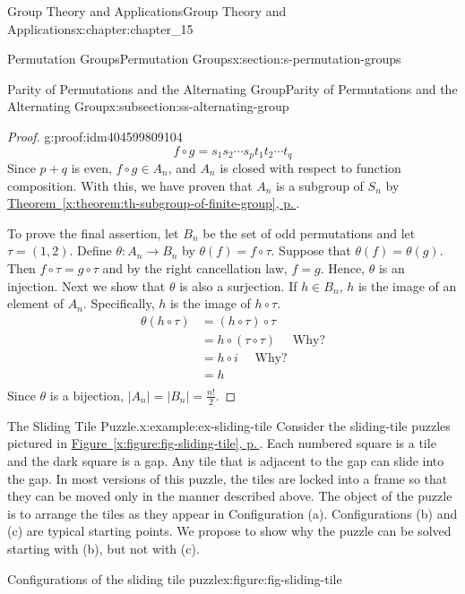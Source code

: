 \documentclass[twoside,10pt,]{book}
\newcommand{\xreffont}{\relax}
\numberwithin{equation}{section}
\begin{document}
\begin{chapterptx}{Group Theory and Applications}{}{Group Theory and Applications}{}{}{x:chapter:chapter_15}
\begin{sectionptx}{Permutation Groups}{}{Permutation Groups}{}{}{x:section:s-permutation-groups}
\begin{subsectionptx}{Parity of Permutations and the Alternating Group}{}{Parity of Permutations and the Alternating Group}{}{}{x:subsection:ss-alternating-group}
\begin{proof}{}{g:proof:idm404599809104}
\begin{equation*}
f\circ g=s_1s_2\cdots  s_pt_1t_2\cdots  t_q
\end{equation*}
Since \(p+q\) is even, \(f\circ g \in A_n\), and \(A_n\) is closed with respect to function composition.  With this, we have proven that \(A_n\) is a subgroup of \(S_n\) by \hyperref[x:theorem:th-subgroup-of-finite-group]{Theorem~{\xreffont\ref{x:theorem:th-subgroup-of-finite-group}}, p.\,\pageref{x:theorem:th-subgroup-of-finite-group}}.%
\par
To prove the final assertion, let \(B_n\) be the set of odd permutations and let \(\tau  = (1,2)\). Define \(\theta: A_n \to  B_n\) by \(\theta(f) = f\circ \tau\). Suppose that \(\theta(f) = \theta(g)\). Then \(f\circ \tau  = g\circ \tau \) and by the right cancellation law,  \(f = g\). Hence, \(\theta\) is an injection.  Next we show that \(\theta\) is also a surjection.  If \(h \in  B_n\), \(h\) is the image of an element of \(A_n\).  Specifically, \(h\) is the image of \(h\circ \tau\).%
\begin{equation*}
\begin{split}
\theta(h\circ \tau ) & = (h\circ \tau )\circ \tau\\
& = h\circ (\tau \circ \tau )\quad \textrm{   Why?}\\
& = h\circ i\quad \textrm{    Why?}\\
& = h\\
\end{split}
\end{equation*}
Since \(\theta\) is a bijection,   \(\lvert A_n \rvert =\lvert B_n\rvert =\frac{n!}{2}\).%
\end{proof}
\begin{example}{The Sliding Tile Puzzle.}{x:example:ex-sliding-tile}%
Consider the sliding-tile puzzles pictured in \hyperref[x:figure:fig-sliding-tile]{Figure~{\xreffont\ref{x:figure:fig-sliding-tile}}, p.\,\pageref{x:figure:fig-sliding-tile}}. Each numbered square is a tile and the dark square is a gap. Any tile that is adjacent to the gap can slide into the gap. In most versions of this puzzle, the tiles are locked into a frame so that they can be moved only in the manner described above. The object of the puzzle is to arrange the tiles as they appear in Configuration (a).  Configurations (b) and (c) are typical starting points. We propose to show why the puzzle can be solved starting with (b), but not with (c).%
\begin{figureptx}{Configurations of the sliding tile puzzle}{x:figure:fig-sliding-tile}{}%

\end{figureptx}
\end{example}
\end{subsectionptx}
\end{sectionptx}
\end{chapterptx}
\end{document}
